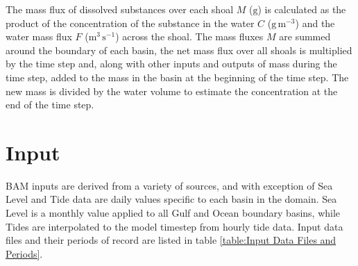 The mass flux of dissolved substances over each shoal $M$ ($\mathrm{g}$) is calculated as the product of the concentration of the substance in the water $C$ ($\mathrm{g \, m^{-3}}$) and the water mass flux $F$ ($\mathrm{m^{3} \, s^{-1}}$) across the shoal.  The mass fluxes $M$ are summed around the boundary of each basin, the net mass flux over all shoals is multiplied by the time step and, along with other inputs and outputs of mass during the time step, added to the mass in the basin at the beginning of the time step. The new mass is divided by the water volume to estimate the concentration at the end of the time step. 


\clearpage 
\section{Input}
\label{sec:Input}
BAM inputs are derived from a variety of sources, and with exception of Sea Level and Tide data are daily values specific to each basin in the domain.  Sea Level is a monthly value applied to all Gulf and Ocean boundary basins, while Tides are interpolated to the model timestep from hourly tide data.  Input data files and their periods of record are listed in table \ref{table:Input Data Files and Periods}. 

